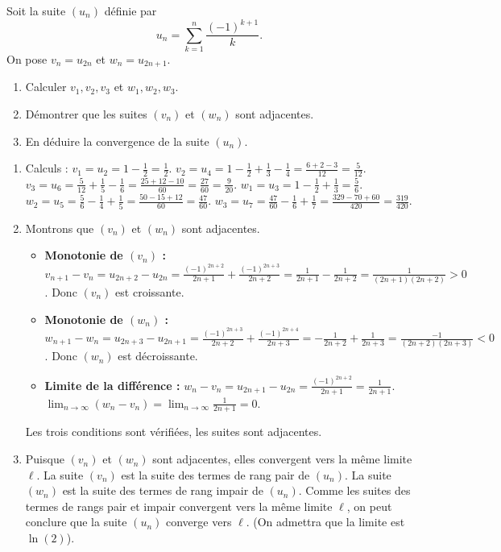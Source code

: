 \documentclass[]{exercices}
\begin{document}
\begin{exercice}[\di]
	Soit la suite $(u_n)$ définie par
	\[
		u_n=\sum_{k=1}^{n}\frac{(-1)^{k+1}}{k}.
	\]
	On pose $v_n=u_{2n}$ et $w_n=u_{2n+1}$.
	\begin{enumerate}
		\item Calculer $v_1,v_2,v_3$ et $w_1,w_2,w_3$.
		\item Démontrer que les suites $(v_n)$ et $(w_n)$ sont adjacentes.
		\item En déduire la convergence de la suite $(u_n)$.
	\end{enumerate}
\end{exercice}

\begin{solution}
	\begin{enumerate}
		\item Calculs :
		      $v_1 = u_2 = 1 - \frac{1}{2} = \frac{1}{2}$.
		      $v_2 = u_4 = 1 - \frac{1}{2} + \frac{1}{3} - \frac{1}{4} = \frac{6+2-3}{12} = \frac{5}{12}$.
		      $v_3 = u_6 = \frac{5}{12} + \frac{1}{5} - \frac{1}{6} = \frac{25+12-10}{60} = \frac{27}{60} = \frac{9}{20}$.
		      $w_1 = u_3 = 1 - \frac{1}{2} + \frac{1}{3} = \frac{5}{6}$.
		      $w_2 = u_5 = \frac{5}{6} - \frac{1}{4} + \frac{1}{5} = \frac{50-15+12}{60} = \frac{47}{60}$.
		      $w_3 = u_7 = \frac{47}{60} - \frac{1}{6} + \frac{1}{7} = \frac{329-70+60}{420} = \frac{319}{420}$.
		\item Montrons que $(v_n)$ et $(w_n)$ sont adjacentes.
		      \begin{itemize}
			      \item \textbf{Monotonie de $(v_n)$ :} $v_{n+1}-v_n = u_{2n+2}-u_{2n} = \frac{(-1)^{2n+2}}{2n+1} + \frac{(-1)^{2n+3}}{2n+2} = \frac{1}{2n+1} - \frac{1}{2n+2} = \frac{1}{(2n+1)(2n+2)} > 0$. Donc $(v_n)$ est croissante.
			      \item \textbf{Monotonie de $(w_n)$ :} $w_{n+1}-w_n = u_{2n+3}-u_{2n+1} = \frac{(-1)^{2n+3}}{2n+2} + \frac{(-1)^{2n+4}}{2n+3} = -\frac{1}{2n+2} + \frac{1}{2n+3} = \frac{-1}{(2n+2)(2n+3)} < 0$. Donc $(w_n)$ est décroissante.
			      \item \textbf{Limite de la différence :} $w_n - v_n = u_{2n+1}-u_{2n} = \frac{(-1)^{2n+2}}{2n+1} = \frac{1}{2n+1}$.
			            $\lim_{n\to\infty} (w_n - v_n) = \lim_{n\to\infty} \frac{1}{2n+1} = 0$.
		      \end{itemize}
		      Les trois conditions sont vérifiées, les suites sont adjacentes.
		\item Puisque $(v_n)$ et $(w_n)$ sont adjacentes, elles convergent vers la même limite $\ell$.
		      La suite $(v_n)$ est la suite des termes de rang pair de $(u_n)$. La suite $(w_n)$ est la suite des termes de rang impair de $(u_n)$.
		      Comme les suites des termes de rangs pair et impair convergent vers la même limite $\ell$, on peut conclure que la suite $(u_n)$ converge vers $\ell$. (On admettra que la limite est $\ln(2)$).
	\end{enumerate}
\end{solution}
\end{document}
